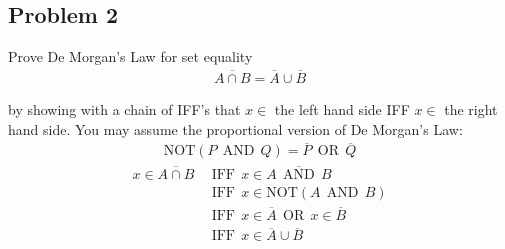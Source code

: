 \documentclass[12pt]{article}
\begin{document}
\subsection*{Problem 2}
\par{Prove De Morgan's Law for set equality}
\begin{align*}
\overline{A\cap B} = \overline{A}\cup\overline{B}
\end{align*}
\par{by showing with a chain of IFF's that $x \in$ the left hand side IFF $x \in$ the right hand side. You may assume the proportional version of De Morgan's Law:}
\begin{align*}
\text{NOT}(P\:\:\text{AND}\:\:Q) = \overline{P}\:\:\text{OR}\:\:\overline{Q}
\end{align*}
\begin{align*}
x \in \overline{A \cap B}\:\:&\text{IFF}\:\:x \in \overline{A\:\:\text{AND}\:\:B} \\
&\text{IFF}\:\: x \in \text{NOT}(A\:\:\text{AND}\:\:B) \\
&\text{IFF}\:\: x \in \overline{A}\:\:\text{OR}\:\:x \in \overline{B} \\
&\text{IFF}\:\: x \in \overline{A} \cup \overline{B}
\end{align*}
\end{document}
